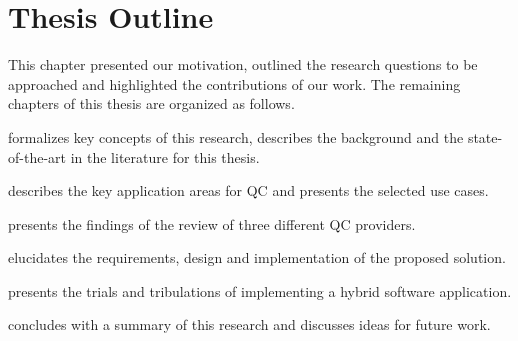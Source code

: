 \section{Thesis Outline}
\label{sect:introduction--thesis-outline}
This chapter presented our motivation, outlined the research questions to be approached and highlighted the contributions of our work. The remaining chapters of this thesis are organized as follows.

\begin{description}[leftmargin=3.5em]
	\item[Chapter 2:] formalizes key concepts of this research, describes the background and the state-of-the-art in the literature for this thesis.
	\item[Chapter 3:] describes the key application areas for QC and presents the selected use cases.
    \item[Chapter 4:] presents the findings of the review of three different QC providers.
    \item[Chapter 5:] elucidates the requirements, design and implementation of the proposed solution.
    \item[Chapter 6:] presents the trials and tribulations of implementing a hybrid software application.
    \item[Chapter 7:] concludes with a summary of this research and discusses ideas for future work.
\end{description}
